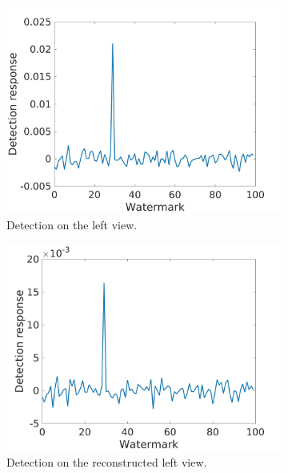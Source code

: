 \begin{figure}[h!]
\centering
\begin{subfigure}[t]{0.5\textwidth}
\centering
\includegraphics[width=1\textwidth]{./img/corr_gauss/left_corr_value_3.jpg}
  \caption{\small{Detection on the left view.}\label{fig:gl3}}
\end{subfigure}%
\begin{subfigure}[t]{0.5\textwidth}
\centering
\includegraphics[width=1\textwidth]{./img/corr_gauss/right_warpedwat_corr_value_3.jpg}
\caption{\small{Detection on the reconstructed left view.}\label{fig:grw3}}
\end{subfigure}
\begin{subfigure}[t]{0.5\textwidth}
\centering

\end{subfigure}
\end{figure}
